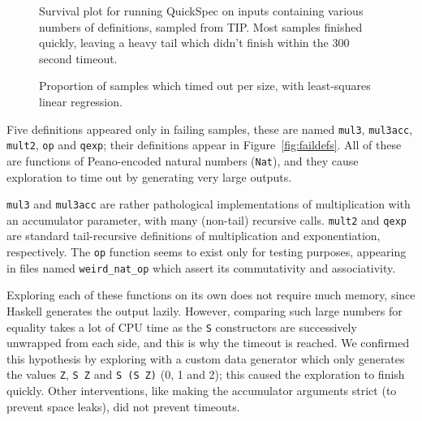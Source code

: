\begin{figure}
  
  \caption{Survival plot %
    for running QuickSpec on inputs containing various numbers of definitions,
    sampled from TIP. Most samples finished quickly, leaving a heavy tail which
    didn't finish within the 300 second timeout.}
  \label{fig:survival}
\end{figure}

\begin{figure}
  
  \caption{Proportion of samples which timed out per size, with least-squares
    linear regression.}
  \label{fig:tailsize}
\end{figure}

\begin{figure}
  
  \caption{}
  \label{fig:proportions}
\end{figure}

Five definitions appeared only in failing samples, these are named
\texttt{mul3}, \texttt{mul3acc}, \texttt{mult2}, \texttt{op} and \texttt{qexp};
their definitions appear in Figure~\ref{fig:faildefs}. All of these are
functions of Peano-encoded natural numbers (\texttt{Nat}), and they cause
exploration to time out by generating very large outputs.

\texttt{mul3} and \texttt{mul3acc} are rather pathological implementations of
multiplication with an accumulator parameter, with many (non-tail) recursive
calls. \texttt{mult2} and \texttt{qexp} are standard tail-recursive definitions
of multiplication and exponentiation, respectively. The \texttt{op} function
seems to exist only for testing purposes, appearing in files named
\texttt{weird_nat_op} which assert its commutativity and associativity.

Exploring each of these functions on its own does not require much memory, since
Haskell generates the output lazily. However, comparing such large numbers for
equality takes a lot of CPU time as the \texttt{S} constructors are successively
unwrapped from each side, and this is why the timeout is reached. We confirmed
this hypothesis by exploring with a custom data generator which only generates
the values \texttt{Z}, \texttt{S Z} and \texttt{S (S Z)} (0, 1 and 2); this
caused the exploration to finish quickly. Other interventions, like making the
accumulator arguments strict (to prevent space leaks), did not prevent timeouts.

